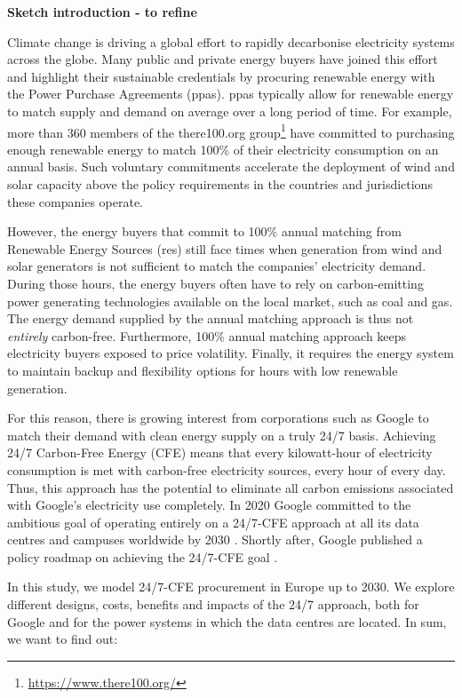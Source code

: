 \textbf{Sketch introduction - to refine}

Climate change is driving a global effort to rapidly decarbonise electricity systems across the globe. 
Many public and private energy buyers have joined this effort and highlight their sustainable credentials by procuring renewable energy with the Power Purchase Agreements (\gls{ppa}s).
\gls{ppa}s typically allow for renewable energy to match supply and demand on average over a long period of time. 
For example, more than 360 members of the there100.org group\footnote{\url{https://www.there100.org/}} have committed to purchasing enough renewable energy to match 100\% of their electricity consumption on an annual basis. 
Such voluntary commitments accelerate the deployment of wind and solar capacity above the policy requirements in the countries and jurisdictions these companies operate.

However, the energy buyers that commit to 100\% annual matching from Renewable Energy Sources (\gls{res}) still face times when generation from wind and solar generators is not sufficient to match the companies' electricity demand.
During those hours, the energy buyers often have to rely on carbon-emitting power generating technologies available on the local market, such as coal and gas. 
The energy demand supplied by the annual matching approach is thus not \textit{entirely} carbon-free. 
Furthermore, 100\% annual matching approach keeps electricity buyers exposed to price volatility. 
Finally, it requires the energy system to maintain backup and flexibility options for hours with low renewable generation.

For this reason, there is growing interest from corporations such as Google to match their demand with clean energy supply on a truly 24/7 basis. 
Achieving 24/7 Carbon-Free Energy (CFE) means that every kilowatt-hour of electricity consumption is met with carbon-free electricity sources, every hour of every day. 
Thus, this approach has the potential to eliminate all carbon emissions associated with Google's electricity use completely. 
In 2020 Google committed to the ambitious goal of operating entirely on a 24/7-CFE approach at all its data centres and campuses worldwide by 2030 \cite{google-247by2030}. 
Shortly after, Google published a policy roadmap on achieving the 24/7-CFE goal \cite{google-PolicyRoadmap}.

In this study, we model 24/7-CFE procurement in Europe up to 2030. 
We explore different designs, costs, benefits and impacts of the 24/7 approach, both for Google and for the power systems in which the data centres are located. 
In sum, we want to find out: 

